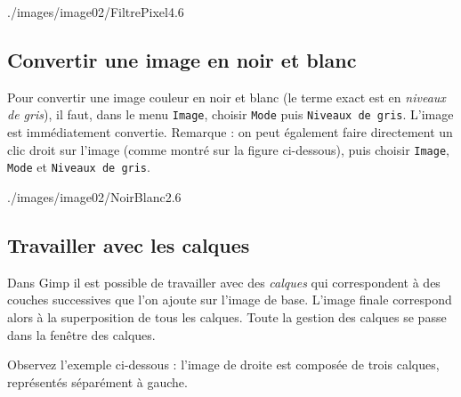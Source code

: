 %
              {./images/image02/FiltrePixel4}{.6\textwidth}




\subsection{Convertir une image en noir et blanc}\label{Gimp2ConvertirNoirBlanc}

 Pour convertir une image couleur en noir et blanc (le terme exact est en \emph{niveaux de gris}), il faut, dans le menu \texttt{Image}, choisir \texttt{Mode} puis \texttt{Niveaux de gris}. L'image est immédiatement convertie. Remarque : on peut également faire directement un clic droit sur l'image (comme montré sur la figure ci-dessous), puis choisir \texttt{Image}, \texttt{Mode} et \texttt{Niveaux de gris}.

%
              {./images/image02/NoirBlanc2}{.6\textwidth}




\subsection{Travailler avec les calques}\label{Gimp2Calques}

Dans Gimp il est possible de travailler avec des \emph{calques} qui correspondent à des couches successives que l'on ajoute sur l'image de base. L'image finale correspond alors à la superposition de tous les calques. Toute la gestion des calques se passe dans la fenêtre des calques.

\vspace{6pt}

Observez l'exemple ci-dessous : l'image de droite est composée de trois calques, représentés séparément à gauche.

\vspace{12pt}

